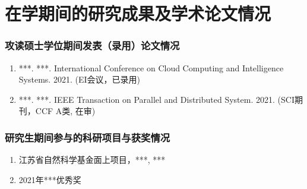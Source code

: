 \chapter{在学期间的研究成果及学术论文情况}


\subsection*{攻读硕士学位期间发表（录用）论文情况}


\begin{enumerate}
  \item ***. ***. International Conference on Cloud Computing and Intelligence Systems. 2021. (EI会议，已录用)
  \item ***. ***. IEEE Transaction on Parallel and Distributed System. 2021. (SCI期刊，CCF A类, 在审)
\end{enumerate}

\subsection*{研究生期间参与的科研项目与获奖情况}

\begin{enumerate}
  \item 江苏省自然科学基金面上项目，***, ***
  \item 2021年***优秀奖
\end{enumerate}

